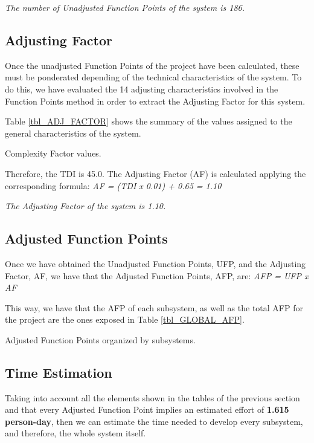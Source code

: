 \emph{The number of Unadjusted Function Points of the system is 186.}


\subsection{Adjusting Factor}
Once the unadjusted Function Points of the project have been calculated, these must be ponderated depending of the technical characteristics of the system. To do this, we have evaluated the 14 adjusting characterístics involved in the Function Points method in order to extract the Adjusting Factor for this system.

Table \ref{tbl_ADJ_FACTOR} shows the summary of the values assigned to the general characteristics of the system.

\begin{table}[hbtp]
\centering

\caption{Complexity Factor values.}
\label{tbl_ADJ_FACTOR}
\end{table}

Therefore, the TDI is 45.0. The Adjusting Factor (AF) is calculated applying the corresponding formula:
\emph{AF = (TDI x 0.01) + 0.65 = 1.10}

\emph{The Adjusting Factor of the system is 1.10.}

\subsection{Adjusted Function Points}
Once we have obtained the Unadjusted Function Points, UFP, and the Adjusting Factor, AF, we have that the Adjusted Function Points, AFP, are:
\emph{AFP = UFP x AF}

This way, we have that the AFP of each subsystem, as well as the total AFP for the project are the ones exposed in Table \ref{tbl_GLOBAL_AFP}.

\begin{table}[hbtp]
\centering

\caption{Adjusted Function Points organized by subsystems.}
\label{tbl_GLOBAL_AFP}
\end{table}


\subsection{Time Estimation}

Taking into account all the elements shown in the tables of the previous section and that every Adjusted Function Point implies an estimated effort of \textbf{1.615 person-day}, then we can estimate the time needed to develop every subsystem, and therefore, the whole system itself.

